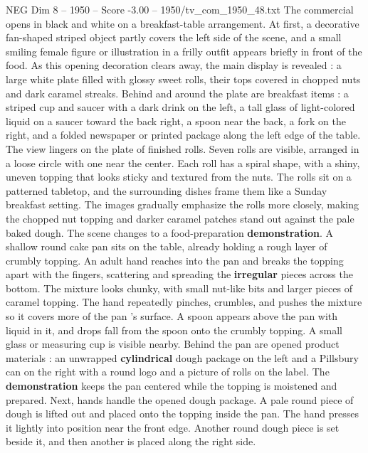\begin{textsample}{NEG Dim 8 – 1950 – Score -3.00 – 1950/tv\_com\_1950\_48.txt}  \label{ex:f8_neg_023}
The commercial opens in black and white on a breakfast-table arrangement.
At first, a decorative fan-shaped striped object partly covers the left side of the scene, and a small smiling female figure or illustration in a frilly outfit appears briefly in front of the food.
As this opening decoration clears away, the main display is revealed : a large white plate filled with glossy sweet rolls, their tops covered in chopped nuts and dark caramel streaks.
Behind and around the plate are breakfast items : a striped cup and saucer with a dark drink on the left, a tall glass of light-colored liquid on a saucer toward the back right, a spoon near the back, a fork on the right, and a folded newspaper or printed package along the left edge of the table.
The view lingers on the plate of finished rolls.
Seven rolls are visible, arranged in a loose circle with one near the center.
Each roll has a spiral shape, with a shiny, uneven topping that looks sticky and textured from the nuts.
The rolls sit on a patterned tabletop, and the surrounding dishes frame them like a Sunday breakfast setting.
The images gradually emphasize the rolls more closely, making the chopped nut topping and darker caramel patches stand out against the pale baked dough.
The scene changes to a food-preparation \textbf{demonstration}.
A shallow round cake pan sits on the table, already holding a rough layer of crumbly topping.
An adult hand reaches into the pan and breaks the topping apart with the fingers, scattering and spreading the \textbf{irregular} pieces across the bottom.
The mixture looks chunky, with small nut-like bits and larger pieces of caramel topping.
The hand repeatedly pinches, crumbles, and pushes the mixture so it covers more of the pan ’s surface.
A spoon appears above the pan with liquid in it, and drops fall from the spoon onto the crumbly topping.
A small glass or measuring cup is visible nearby.
Behind the pan are opened product materials : an unwrapped \textbf{cylindrical} dough package on the left and a Pillsbury can on the right with a round logo and a picture of rolls on the label.
The \textbf{demonstration} keeps the pan centered while the topping is moistened and prepared.
Next, hands handle the opened dough package.
A pale round piece of dough is lifted out and placed onto the topping inside the pan.
The hand presses it lightly into position near the front edge.
Another round dough piece is set beside it, and then another is placed along the right side.

\end{textsample}
